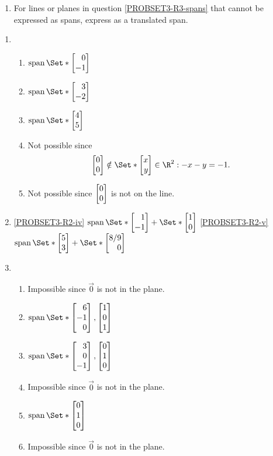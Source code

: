 \begin{exercises}
\begin{problist}
\begin{enumerate}
			\item For lines or planes in question \ref{PROBSET3-R3-spans} that cannot
			be expressed as spans, express as a translated
			span.
		\end{enumerate}
		\begin{solution}
			\begin{enumerate}
				\item
				\begin{enumerate}
					\item $\Span\Set*{\mat{0\\-1}}$
					\item $\Span\Set*{\mat{3\\-2}}$
					\item $\Span\Set*{\mat{4\\5}}$
					\item Not possible since \[\mat{0\\0}\notin \Set*{\mat{x\\y}\in \R^2: -x-y=-1}.\]
					\item Not possible since $\mat{0\\0}$ is not on the line.
				\end{enumerate}
				\item
				\ref{PROBSET3-R2-iv} $\Span\Set*{\mat{1\\-1}} + \Set*{\mat{1\\0}}$
				\ref{PROBSET3-R2-v} $\Span\Set*{\mat{5\\3}} + \Set*{\mat{8/9\\0}}$
				\item 
				\begin{enumerate}
					\item Impossible since $\vec 0$ is not in the plane.
					\item $\Span\Set*{\mat{6\\-1\\0}, \mat{1\\0\\1}}$
					\item $\Span\Set*{\mat{3\\0\\-1}, \mat{0\\1\\0}}$
					\item Impossible since $\vec 0$ is not in the plane.
					\item $\Span\Set*{\mat{0\\1\\0}}$
					\item Impossible since $\vec 0$ is not in the plane.

\end{enumerate}
\end{enumerate}
\end{solution}
\end{problist}
\end{exercises}
